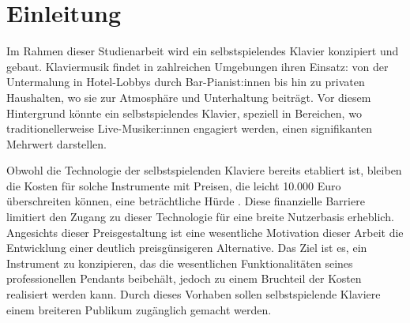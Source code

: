 \chapter{Einleitung} \label{einleitung}

\nocite{*}

Im Rahmen dieser Studienarbeit wird ein selbstspielendes Klavier konzipiert und gebaut.
Klaviermusik findet in zahlreichen Umgebungen ihren Einsatz: von der Untermalung in Hotel-Lobbys durch Bar-Pianist:innen bis hin zu privaten Haushalten,
wo sie zur Atmosphäre und Unterhaltung beiträgt.
Vor diesem Hintergrund könnte ein selbstspielendes Klavier, speziell in Bereichen, wo traditionellerweise Live-Musiker:innen engagiert werden,
einen signifikanten Mehrwert darstellen.

Obwohl die Technologie der selbstspielenden Klaviere bereits etabliert ist, bleiben die Kosten für solche Instrumente mit Preisen,
die leicht 10.000 Euro überschreiten können, eine beträchtliche Hürde \cite*{YamahaU1}.
Diese finanzielle Barriere limitiert den Zugang zu dieser Technologie für eine breite Nutzerbasis erheblich.
Angesichts dieser Preisgestaltung ist eine wesentliche Motivation dieser Arbeit die Entwicklung einer deutlich preisgünsigeren Alternative.
Das Ziel ist es, ein Instrument zu konzipieren, das die wesentlichen Funktionalitäten seines professionellen Pendants beibehält,
jedoch zu einem Bruchteil der Kosten realisiert werden kann.
Durch dieses Vorhaben sollen selbstspielende Klaviere einem breiteren Publikum zugänglich gemacht werden.



